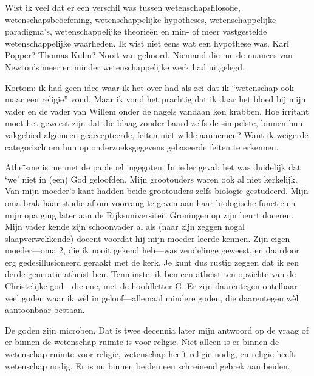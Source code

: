 \documentclass[12pt,a4paper]{article}
\begin{document}
Wist ik veel dat er een verschil was tussen wetenschapsfilosofie, weten\-schaps\-beöef\-ening, wetenschappelijke hypotheses, wetenschappelijke paradigma's, wetenschappelijke theorieën en min- of meer vastgestelde wetenschappelijke waarheden. Ik wist niet eens wat een hypothese was. Karl Popper? Thomas Kuhn? Nooit van gehoord. Niemand die me de nuances van Newton's meer en minder wetenschappelijke werk had uitgelegd.

Kortom: ik had geen idee waar ik het over had als zei dat ik “wetenschap ook maar een religie” vond. Maar ik vond het prachtig dat ik daar het bloed bij mijn vader en de vader van Willem onder de nagels vandaan kon krabben. Hoe irritant moet het geweest zijn dat die blaag zonder baard zelfs de simpelste, binnen hun vakgebied algemeen geaccepteerde, feiten niet wilde aannemen? Want ik weigerde categorisch om hun op onderzoeksgegevens gebaseerde feiten te erkennen.

Atheïsme is me met de paplepel ingegoten. In ieder geval: het was duidelijk dat ‘we’ niet in (een) God geloofden. Mijn grootouders waren ook al niet kerkelijk. Van mijn moeder's kant hadden beide grootouders zelfs biologie gestudeerd. Mijn oma brak haar studie af om voorrang te geven aan haar biologische functie en mijn opa ging later aan de Rijksuniversiteit Groningen op zijn beurt doceren. Mijn vader kende zijn schoonvader al als (naar zijn zeggen nogal slaapverwekkende) docent voordat hij mijn moeder leerde kennen. Zijn eigen moeder—oma 2, die ik nooit gekend heb—was zendelinge geweest, en daardoor erg gedesillusioneerd geraakt met de kerk. Je kunt dus rustig zeggen dat ik een derde-generatie atheïst ben. Tenminste: ik ben een atheïst ten opzichte van de Christelijke god—die ene, met de hoofdletter G. Er zijn daarentegen ontelbaar veel goden waar ik wèl in geloof—allemaal mindere goden, die daarentegen wèl aantoonbaar bestaan.

De goden zijn microben. Dat is twee decennia later mijn antwoord op de vraag of er binnen de wetenschap ruimte is voor religie. Niet alleen is er binnen de wetenschap ruimte voor religie, wetenschap heeft religie nodig, en religie heeft wetenschap nodig. Er is nu binnen beiden een schreinend gebrek aan beiden.
\end{document}
